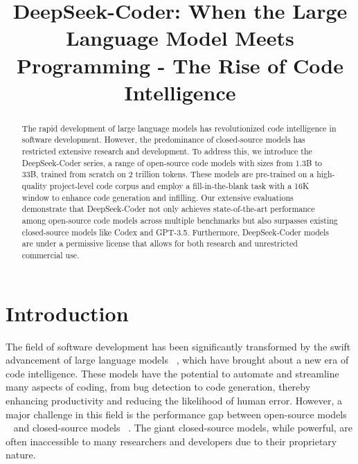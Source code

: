 \title{DeepSeek-Coder: When the Large Language Model Meets Programming - The Rise of Code Intelligence}

\begin{abstract}
The rapid development of large language models has revolutionized code intelligence in software development. However, the predominance of closed-source models has restricted extensive research and development. To address this, we introduce the DeepSeek-Coder series, a range of open-source code models with sizes from 1.3B to 33B, trained from scratch on 2 trillion tokens. These models are pre-trained on a high-quality project-level code corpus and employ a fill-in-the-blank task with a 16K window to enhance code generation and infilling. Our extensive evaluations demonstrate that DeepSeek-Coder not only achieves state-of-the-art performance among open-source code models across multiple benchmarks but also surpasses existing closed-source models like Codex and GPT-3.5. Furthermore, DeepSeek-Coder models are under a permissive license that allows for both research and unrestricted commercial use.
\end{abstract}

\section{Introduction}
\label{par:intro}
The field of software development has been significantly transformed by the swift advancement of large language models ~\citep{touvron2023llama,openai2023gpt4}, which have brought about a new era of code intelligence. These models have the potential to automate and streamline many aspects of coding, from bug detection to code generation, thereby enhancing productivity and reducing the likelihood of human error. However, a major challenge in this field is the performance gap between open-source models ~\citep{roziere2023code,li2023starcoder,nijkamp2022codegen,wang2021codet5}  and closed-source models ~\citep{openai2023gpt4,gemini}. The giant closed-source models, while powerful, are often inaccessible to many researchers and developers due to their proprietary nature. 

